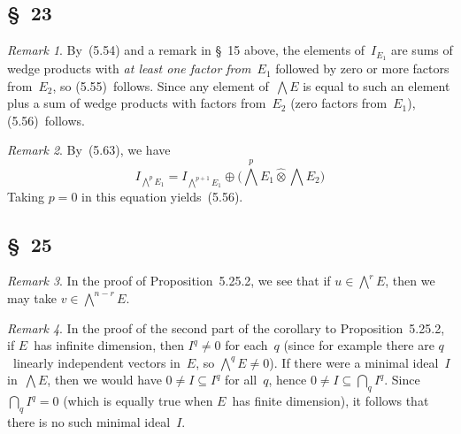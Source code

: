 \documentclass[letterpaper,12pt]{article}
\newcommand{\bigsect}{\bigcap}
\newcommand{\dsum}{\oplus}
\newcommand{\stprod}{\mathbin{\widehat{\otimes}}}
\newcommand{\bigeprod}{\bigwedge}
\newcommand{\medeprod}{{\textstyle\bigeprod}}
\theoremstyle{definition}
\theoremstyle{remark}
\newtheorem*{rmk}{Remark}
\begin{document}
\subsection*{\S~23}
\begin{rmk}
By~(5.54) and a remark in \S~15 above, the elements of~\(I_{E_1}\) are sums of wedge products with \emph{at least one factor from~\(E_1\)} followed by zero or more factors from~\(E_2\), so (5.55)~follows. Since any element of~\(\medeprod E\) is equal to such an element plus a sum of wedge products with factors from~\(E_2\) (zero factors from~\(E_1\)), (5.56)~follows.
\end{rmk}

\begin{rmk}
By~(5.63), we have
\[I_{\bigeprod^p E_1}=I_{\bigeprod^{p+1}E_1}\dsum\bigl(\medeprod^p E_1\stprod\medeprod E_2\bigr)\]
Taking \(p=0\) in this equation yields~(5.56).
\end{rmk}

\subsection*{\S~25}
\begin{rmk}
In the proof of Proposition~5.25.2, we see that if \(u\in\medeprod^r E\), then we may take \(v\in\medeprod^{n-r}E\).
\end{rmk}

\begin{rmk}
In the proof of the second part of the corollary to Proposition~5.25.2, if \(E\)~has infinite dimension, then \(I^q\ne 0\) for each~\(q\) (since for example there are \(q\)~linearly independent vectors in~\(E\), so \(\medeprod^q E\ne 0\)). If there were a minimal ideal~\(I\) in~\(\medeprod E\), then we would have \(0\ne I\subseteq I^q\) for all~\(q\), hence \(0\ne I\subseteq\bigsect_q I^q\). Since \(\bigsect_q I^q=0\) (which is equally true when \(E\)~has finite dimension), it follows that there is no such minimal ideal~\(I\).
\end{rmk}
\end{document}
